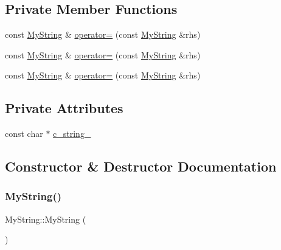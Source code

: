 \subsection*{Private Member Functions}
\begin{DoxyCompactItemize}
\item 
const \mbox{\hyperlink{class_my_string}{My\+String}} \& \mbox{\hyperlink{class_my_string_a0156d24764b9d8e4303763750f95cd38}{operator=}} (const \mbox{\hyperlink{class_my_string}{My\+String}} \&rhs)
\item 
const \mbox{\hyperlink{class_my_string}{My\+String}} \& \mbox{\hyperlink{class_my_string_a0156d24764b9d8e4303763750f95cd38}{operator=}} (const \mbox{\hyperlink{class_my_string}{My\+String}} \&rhs)
\item 
const \mbox{\hyperlink{class_my_string}{My\+String}} \& \mbox{\hyperlink{class_my_string_a0156d24764b9d8e4303763750f95cd38}{operator=}} (const \mbox{\hyperlink{class_my_string}{My\+String}} \&rhs)
\end{DoxyCompactItemize}
\subsection*{Private Attributes}
\begin{DoxyCompactItemize}
\item 
const char $\ast$ \mbox{\hyperlink{class_my_string_ab00e8ed203d462deab99236e41c2f06a}{c\+\_\+string\+\_\+}}
\end{DoxyCompactItemize}


\subsection{Constructor \& Destructor Documentation}
\mbox{\label{class_my_string_a1cb17852b83614394b59720779c5f918}} 
\subsubsection{\texorpdfstring{MyString()}{MyString()}\hspace{0.1cm}{\footnotesize\ttfamily [1/9]}}
{\footnotesize\ttfamily My\+String\+::\+My\+String (\begin{DoxyParamCaption}{ }\end{DoxyParamCaption})\hspace{0.3cm}{\ttfamily [inline]}}

